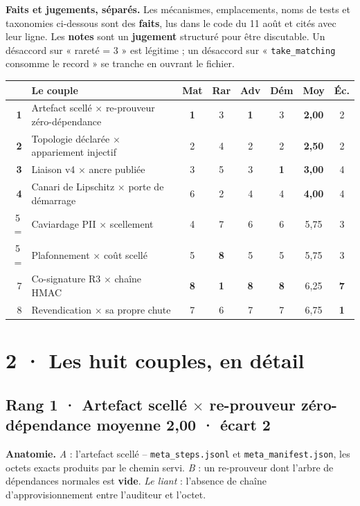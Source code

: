 \documentclass[10pt]{article}
\newcommand{\best}[1]{{\color{green}\textbf{#1}}}
\newcommand{\pire}[1]{{\color{red}\textbf{#1}}}
\newcommand{\sz}[1]{{\small\color{grey}\textsf{#1}}}
\newcommand{\code}[1]{\texttt{\small #1}}
\newcommand{\x}{$\times$}
\newcommand{\couple}[4]{%
  \subsection{#1 · #2 \hfill {\normalsize\color{grey}moyenne \textbf{#3} · écart #4}}}
\begin{document}
\begin{alerte}
\textbf{Faits et jugements, séparés.} Les mécanismes, emplacements, noms de tests et taxonomies
ci-dessous sont des \textbf{faits}, lus dans le code du 11 août et cités avec leur ligne. Les
\textbf{notes} sont un \textbf{jugement} structuré pour être discutable. Un désaccord sur « rareté = 3 »
est légitime ; un désaccord sur « \code{take\_matching} consomme le record » se tranche en ouvrant le
fichier.
\end{alerte}

\renewcommand{\arraystretch}{1.12}
\begin{center}\small
\begin{tabular}{@{}r >{\raggedright\arraybackslash}p{6.6cm} cccc c c@{}}
\toprule
& \textbf{Le couple} & \sz{Mat} & \sz{Rar} & \sz{Adv} & \sz{Dém} & \textbf{Moy} & \sz{Éc.} \\
\midrule
\textbf{1} & Artefact scellé \x{} re-prouveur zéro-dépendance & \best{1} & 3 & \best{1} & 3 & \textbf{2,00} & 2 \\
\textbf{2} & Topologie déclarée \x{} appariement injectif & 2 & 4 & 2 & 2 & \textbf{2,50} & 2 \\
\textbf{3} & Liaison v4 \x{} ancre publiée & 3 & 5 & 3 & \best{1} & \textbf{3,00} & 4 \\
\textbf{4} & Canari de Lipschitz \x{} porte de démarrage & 6 & 2 & 4 & 4 & \textbf{4,00} & 4 \\
5\,= & Caviardage PII \x{} scellement & 4 & 7 & 6 & 6 & 5,75 & 3 \\
5\,= & Plafonnement \x{} coût scellé & 5 & \pire{8} & 5 & 5 & 5,75 & 3 \\
7 & Co-signature R3 \x{} chaîne HMAC & \pire{8} & \best{1} & \pire{8} & \pire{8} & 6,25 & \pire{7} \\
8 & Revendication \x{} sa propre chute & 7 & 6 & 7 & 7 & 6,75 & \best{1} \\
\bottomrule
\end{tabular}
\end{center}

\section{2 · Les huit couples, en détail}

\couple{Rang 1}{Artefact scellé \x{} re-prouveur zéro-dépendance}{2,00}{2}

\textbf{Anatomie.} \emph{A} : l'artefact scellé -- \code{meta\_steps.jsonl} et
\code{meta\_manifest.json}, les octets exacts produits par le chemin servi. \emph{B} : un re-prouveur
dont l'arbre de dépendances normales est \textbf{vide}. \emph{Le liant} : l'absence de chaîne
d'approvisionnement entre l'auditeur et l'octet.
\end{document}
